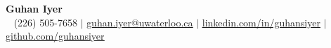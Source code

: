 
\begin{center}
    {\Huge \textbf{Guhan Iyer}} \\ \vspace{3pt}
    \normalsize \raisebox{-0.1\height} ~ %
    (226) 505-7658 {$\mid$} %
    \href{mailto:guhan.iyer@uwaterloo.ca}{\uline{guhan.iyer@uwaterloo.ca}} {$\mid$}
    \href{https://linkedin.com/in/guhansiyer/}{ \uline{linkedin.com/in/guhansiyer}} {$\mid$} 
    \href{https://github.com/guhansiyer}{ \uline{github.com/guhansiyer}}
\end{center}
